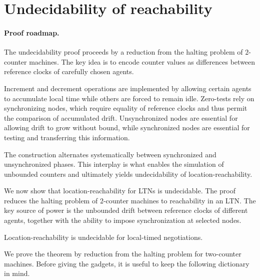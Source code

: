 
\section{Undecidability of reachability}
\label{sec:ltn-undec}

\paragraph{Proof roadmap.}
The undecidability proof proceeds by a reduction from the halting problem of
$2$-counter machines.  The key idea is to encode counter values as differences
between reference clocks of carefully chosen agents.

Increment and decrement operations are implemented by allowing certain agents to
accumulate local time while others are forced to remain idle.  Zero-tests rely on
synchronizing nodes, which require equality of reference clocks and thus permit
the comparison of accumulated drift.  Unsynchronized nodes are essential for
allowing drift to grow without bound, while synchronized nodes are essential for
testing and transferring this information.

The construction alternates systematically between synchronized and
unsynchronized phases.  This interplay is what enables the simulation of
unbounded counters and ultimately yields undecidability of
location-reachability.

We now show that location-reachability for LTNs is undecidable.  The proof reduces
the halting problem of $2$-counter machines to reachability in an LTN.  The key
source of power is the unbounded drift between reference clocks of different agents,
together with the ability to impose synchronization at selected nodes.

\begin{theorem}
\label{thm:undecidability}
Location-reachability is undecidable for local-timed negotiations.
\end{theorem}

We prove the theorem by reduction from the halting problem for two-counter
machines.  Before giving the gadgets, it is useful to keep the following
dictionary in mind.

